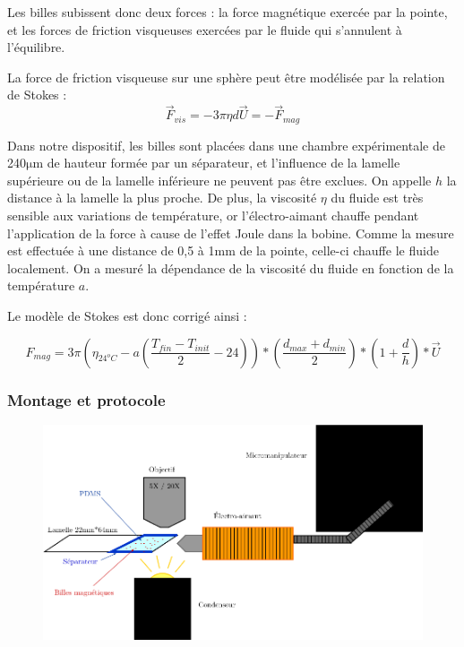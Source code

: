 \documentclass{report}
\newcommand{\micro}{$\mathrm{\mu}$}
\begin{document}
 Les billes subissent donc deux forces : la force magnétique exercée par la pointe, et les forces de friction visqueuses exercées par le fluide qui s'annulent à l'équilibre. 
 
 La force de friction visqueuse sur une sphère peut être modélisée par la relation de Stokes : 
 $$ \vec{F}_{vis}=- 3 \pi \eta d \vec{U} =-\vec{F}_{mag}$$
 
 Dans notre dispositif, les billes sont placées dans une chambre expérimentale de 240\micro m de hauteur formée par un séparateur, et l'influence de la lamelle supérieure ou de la lamelle inférieure ne peuvent pas être exclues. On appelle $h$ la distance à la lamelle la plus proche. 
 De plus, la viscosité $\eta$ du fluide est très sensible aux variations de température, or l'électro-aimant chauffe pendant l'application de la force à cause de l'effet Joule dans la bobine. 
 Comme la mesure est effectuée à une distance de 0,5 à 1mm de la pointe, celle-ci chauffe le fluide localement. 
 On a mesuré la dépendance de la viscosité du fluide en fonction de la température $a$. 
 
 Le modèle de Stokes est donc corrigé ainsi : 
 
 \begin{equation}
 {F}_{mag}= 3 \pi \left(\eta_{24^{o}C}-a\left(\frac{T_{fin}-T_{init}}{2} - 24\right) \right) *\left( \frac{d_{max}+d_{min}}{2} \right) * \left( 1+\frac{d}{h} \right)*\vec{U}
 \label{Stokes_corr}
 \end{equation}
 
 \subsubsection{Montage et protocole}
 
 \begin{figure}
 \includegraphics[scale=0.4]{Calibration_pinces.png}
 \label{calibration_pinces}
 \end{figure}
 
\end{document}
